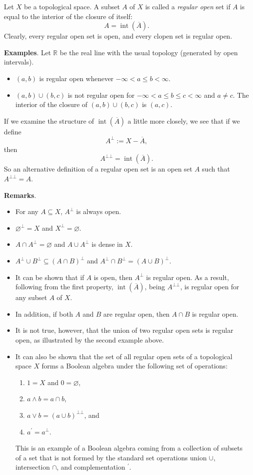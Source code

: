 \documentclass[12pt]{article}
\begin{document}
Let $X$ be a topological space.  A subset $A$ of $X$ is called a
\emph{regular open} set if $A$ is equal to the interior of the closure of itself:
$$A=\operatorname{int}(\overline{A}).$$
Clearly, every regular open set is open, and every clopen set is regular open.

\textbf{Examples}.  Let $\mathbb{R}$ be the real line with the usual
topology (generated by open intervals).
\begin{itemize}
\item $(a,b)$ is regular open whenever $-\infty<a\leq b<\infty$.
\item $(a,b)\cup(b,c)$ is not regular open for $-\infty<a\leq b
\leq c<\infty$ and $a\neq c$.  The interior of the closure of
$(a,b)\cup(b,c)$ is $(a,c)$.
\end{itemize}

If we examine the structure of $\operatorname{int}(\overline{A})$ a
little more closely, we see that if we define
$$A^{\bot}:=X-\overline{A},$$ then $$A^{\bot\bot}=
\operatorname{int}(\overline{A}).$$  So an alternative definition of
a regular open set is an open set $A$ such that $A^{\bot\bot}=A$.

\textbf{Remarks}.
\begin{itemize}
\item For any $A\subseteq X$, $A^{\bot}$ is always open.
\item $\varnothing^{\bot}=X$ and $X^{\bot}=\varnothing$.
\item $A\cap A^{\bot}=\varnothing$ and $A\cup A^{\bot}$ is dense in
$X$.
\item $A^{\bot}\cup B^{\bot}\subseteq(A\cap
B)^{\bot}$ and $A^{\bot}\cap B^{\bot}=(A\cup B)^{\bot}$.
\item It can be shown that if $A$ is open, then $A^{\bot}$ is
regular open.  As a result, following from the first property, $\operatorname{int}(\overline{A})$, being $A^{\bot\bot}$, is regular open for any subset $A$ of $X$.
\item In addition, if both $A$ and $B$ are regular open, then $A\cap
B$ is regular open.
\item It is not true, however, that the union of two regular open
sets is regular open, as illustrated by the second example above.
\item It can also be shown that the set of all regular open sets of
a topological space $X$ forms a Boolean algebra under the following
set of operations:
\begin{enumerate}
\item $1=X$ and $0=\varnothing$,
\item $a\land b=a\cap b$,
\item $a\lor b=(a\cup b)^{\bot\bot}$, and
\item $a^{\prime}=a^{\bot}$.
\end{enumerate}
This is an example of a Boolean algebra coming from a collection of
subsets of a set that is not formed by the standard set operations
union $\cup$, intersection $\cap$, and complementation $^{\prime}$.
\end{itemize}
\end{document}
